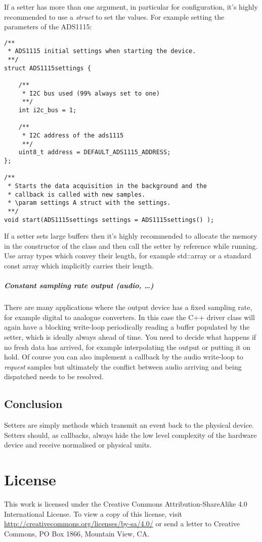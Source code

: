 \documentclass[12pt]{report}
\begin{document}
If a setter has more than one argument, in particular for
configuration, it's highly recommended to use a \textsl{struct} to set
the values. For example setting the parameters of the ADS1115:
\begin{verbatim}
/**
 * ADS1115 initial settings when starting the device.
 **/
struct ADS1115settings {

	/**
	 * I2C bus used (99% always set to one)
	 **/
	int i2c_bus = 1;

	/**
	 * I2C address of the ads1115
	 **/
	uint8_t address = DEFAULT_ADS1115_ADDRESS;
};

/**
 * Starts the data acquisition in the background and the
 * callback is called with new samples.
 * \param settings A struct with the settings.
 **/
void start(ADS1115settings settings = ADS1115settings() );
\end{verbatim}

If a setter sets large buffers then it's highly recommended
to allocate the memory in the constructor of the class and then call the setter by reference
while running. Use array types which convey their length, for example
std::array or a standard const array which implicitly carries their length.

\paragraph{Constant sampling rate output (audio, \ldots)}
There are many applications where the output device has a fixed
sampling rate, for example digital to analogue converters.  In this
case the C++ driver class will again have a blocking write-loop
periodically reading a buffer populated by the setter, which is
ideally always ahead of time.
You need to decide what happens if no
fresh data has arrived, for example interpolating the output or
putting it on hold. Of course you can also implement a callback by the
audio write-loop to \textsl{request} samples but ultimately
the conflict between audio arriving and being dispatched needs to be
resolved.

\section{Conclusion}
Setters are simply methods which transmit an event back to the physical
device. Setters should, as callbacks, always hide the low level
complexity of the hardware device and receive normalised or physical
units.


\clearpage
\appendix
\chapter{License}
This work is licensed under the Creative Commons
Attribution-ShareAlike 4.0 International License. To view a copy of
this license, visit
\url{http://creativecommons.org/licenses/by-sa/4.0/} or
send a letter to Creative Commons, PO Box 1866, Mountain View, CA.
\end{document}
